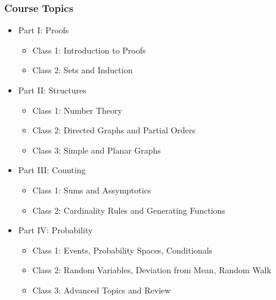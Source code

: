 \documentclass[aspectratio=169]{beamer}
\begin{document}
\begin{frame}
  \frametitle{Course Topics}
  \begin{itemize}
  \item Part I: Proofs
    \begin{itemize}
    \item Class 1: Introduction to Proofs
    \item Class 2: Sets and Induction
    \end{itemize}
  \item Part II: Structures
    \begin{itemize}
    \item Class 1: Number Theory
    \item Class 2: Directed Graphs and Partial Orders
    \item Class 3: Simple and Planar Graphs
    \end{itemize}
  \item Part III: Counting
    \begin{itemize}
    \item Class 1: Sums and Assymptotics
    \item Class 2: Cardinality Rules and Generating Functions
    \end{itemize}
  \item Part IV: Probability
    \begin{itemize}
    \item Class 1: Events, Probability Spaces, Conditionals
    \item Class 2: Random Variables, Deviation from Mean, Random Walk
    \item Class 3: Advanced Topics and Review
    \end{itemize}
  \end{itemize}
\end{frame}

%
%
%
%
\end{document}
